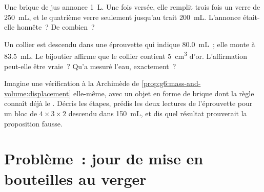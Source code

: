 \begin{exercise}[$\star\star$]\label{exo:g6:mass-and-volume:10}
Une brique de jus annonce \qty{1}{L}. Une fois versée, elle remplit
trois fois un verre de \qty{250}{mL}, et le quatrième verre seulement
jusqu'au trait \qty{200}{mL}. L'annonce était-elle honnête~? De
combien~?
\end{exercise}

\begin{exercise}[$\star\star$]\label{exo:g6:mass-and-volume:11}
Un collier est descendu dans une éprouvette qui indique
\qty{80.0}{mL}~; elle monte à \qty{83.5}{mL}. Le bijoutier affirme
que le collier contient \qty{5}{cm^3} d'or. L'affirmation peut-elle
être vraie~? Qu'a mesuré l'eau, exactement~?
\end{exercise}

\begin{exercise}[$\star\star\star$]\label{exo:g6:mass-and-volume:12}
Imagine une vérification à la Archimède de
\cref{prop:g6:mass-and-volume:displacement} elle-même, avec un objet
en forme de brique dont la règle connaît déjà le . Décris les
étapes, prédis les deux lectures de l'éprouvette pour un bloc de
$4 \times 3 \times 2$  descendu dans \qty{150}{mL}, et dis
quel résultat prouverait la proposition fausse.
\end{exercise}

\section{Problème~: jour de mise en bouteilles au verger}

